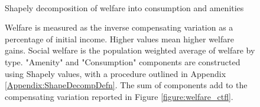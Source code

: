 \documentclass[12pt]{article}
\begin{document}
	\begin{figure}[htbp!]
		\begin{center}
			\caption{ \\ Shapely decomposition of welfare into consumption and amenities}\label{figure:welfareDecomp_ctfl}
		\end{center}
		\caption*{Welfare is measured as the inverse compensating variation as a percentage of initial income. Higher values mean higher welfare gains. Social welfare is the population weighted average of welfare by type. "Amenity" and "Consumption" components are constructed using Shapely values, with a procedure outlined in Appendix \ref{Appendix:ShapeDecompDefn}. The sum of components add to the compensating variation reported in Figure \ref{figure:welfare_ctfl}. }
	\end{figure}
	
\end{document}

